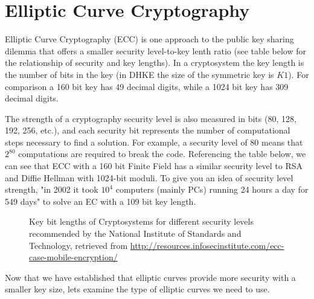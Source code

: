 \section{Elliptic Curve Cryptography}\label{sec:ECC:2}

Elliptic Curve Cryptography (ECC) is one approach to the public key sharing dilemma that offers a smaller security level-to-key lenth ratio (see table below for the relationship  of security and key lengths).  In a cryptosystem the key length is the number of bits in the key (in DHKE the size of the symmetric key is $K1$).  For comparison a 160 bit key has 49 decimal digits, while a 1024 bit key has 309 decimal digits. 

The strength of a cryptography security level is also measured in bits (80, 128, 192, 256, etc.), and each security bit represents the number of computational steps necessary to find a solution.  For example, a security level of 80 means that $2^{80}$ computations are required to break the code. Referencing the table below, we can see that ECC with a 160 bit Finite Field has a similar security level to RSA and Diffie Hellman with 1024-bit moduli. To give you an idea of security level strength, "in 2002 it took $10^4$ computers (mainly PCs) running 24 hours a day for 549 days" to solve an EC with a 109 bit key length. 
\begin{figure} [H]
	  \caption{\label{fig:DH:DHKE_9} Key bit lengths of Cryptosystems for different security levels recommended by the National Institute of Standards and Technology, retrieved from 
\url{http://resources.infosecinstitute.com/ecc-case-mobile-encryption/}}
\end{figure}
Now that we have established that elliptic curves provide more security with a smaller key size, lets examine the type of elliptic curves we need to use.

